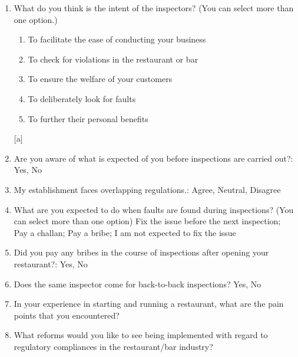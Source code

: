 \documentclass[a4paper, 12pt]{article}
\begin{document}
\begin {enumerate}
 [a]
		\item What do you think is the intent of the inspectors? (You can select more than one option.)
			\begin {enumerate} [a]
			\item To facilitate the ease of conducting your business
			\item To check for violations in the restaurant or bar
			\item To ensure the welfare of your customers
			\item To deliberately look for faults
			\item To further their personal benefits
			\end {enumerate} [a]
		\item Are you aware of what is expected of you before inspections are carried out?: Yes, No
		\item My establishment faces overlapping regulations.: Agree, Neutral, Disagree
		\item What are you expected to do when faults are found during inspections? (You can select more than one option)
		Fix the issue before the next inspection; Pay a challan; Pay a bribe; I am not expected to fix the issue
		\item Did you pay any bribes in the course of inspections after opening your restaurant?: Yes, No
		\item Does the same inspector come for back-to-back inspections? Yes, No
		\item In your experience in starting and running a restaurant, what are the pain points that you encountered?
		\item What reforms would you like to see being implemented with regard to regulatory compliances in the restaurant/bar industry?
		\end {enumerate}
       

                    
                    
                    
\end{document}
